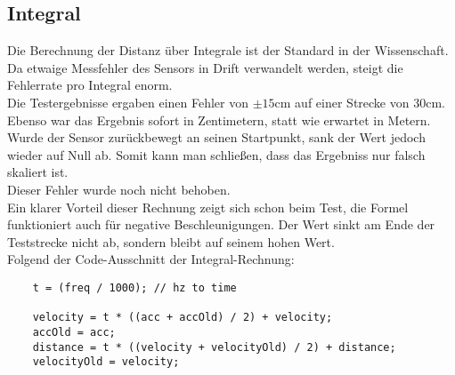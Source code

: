 \subsection{Integral}
Die Berechnung der Distanz über Integrale ist der Standard 
in der Wissenschaft. Da etwaige Messfehler des Sensors in Drift verwandelt 
werden, steigt die Fehlerrate pro Integral enorm.\\
Die Testergebnisse ergaben einen Fehler von $\pm15$cm auf einer Strecke
von 30cm. Ebenso war das Ergebnis sofort in Zentimetern, statt wie erwartet in Metern. 
Wurde der Sensor zurückbewegt an seinen Startpunkt, sank
der Wert jedoch wieder auf Null ab. Somit kann man schließen,
dass das Ergebniss nur falsch skaliert ist.\\
Dieser Fehler wurde noch nicht behoben. \\
Ein klarer Vorteil dieser Rechnung zeigt sich schon beim Test,
die Formel funktioniert auch für negative Beschleunigungen.
Der Wert sinkt am Ende der Teststrecke nicht ab, sondern bleibt
auf seinem hohen Wert.\\
Folgend der Code-Ausschnitt der Integral-Rechnung:
\begin{verbatim}
    t = (freq / 1000); // hz to time

    velocity = t * ((acc + accOld) / 2) + velocity;
    accOld = acc;
    distance = t * ((velocity + velocityOld) / 2) + distance;
    velocityOld = velocity;  
\end{verbatim}